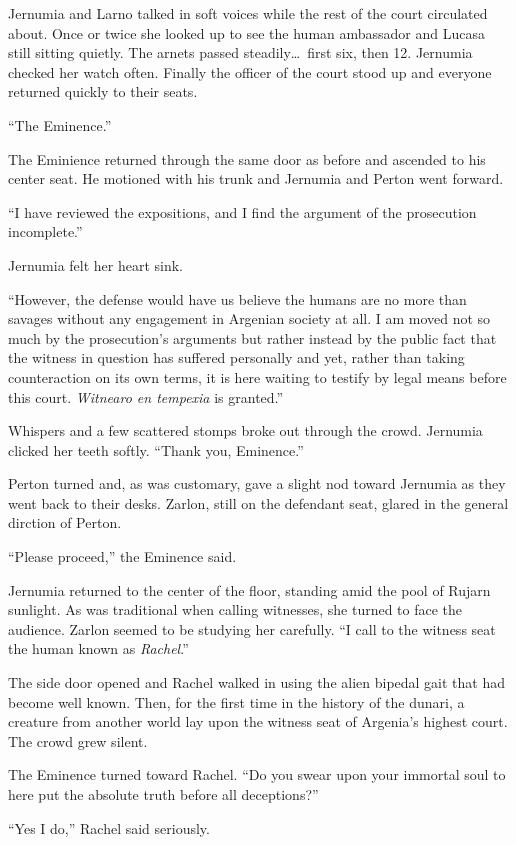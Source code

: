 Jernumia and Larno talked in soft voices while the rest of the court circulated about. Once or
twice she looked up to see the human ambassador and Lucasa still sitting quietly. The arnets
passed steadily\ldots\ first six, then 12. Jernumia checked her watch often. Finally the officer
of the court stood up and everyone returned quickly to their seats.

``The Eminence.''

The Eminience returned through the same door as before and ascended to his center seat. He
motioned with his trunk and Jernumia and Perton went forward.

``I have reviewed the expositions, and I find the argument of the prosecution incomplete.''

Jernumia felt her heart sink.

``However, the defense would have us believe the humans are no more than savages without any
engagement in Argenian society at all. I am moved not so much by the prosecution's arguments but
rather instead by the public fact that the witness in question has suffered personally and yet,
rather than taking counteraction on its own terms, it is here waiting to testify by legal means
before this court. \textit{Witnearo en tempexia} is granted.''

Whispers and a few scattered stomps broke out through the crowd. Jernumia clicked her teeth
softly. ``Thank you, Eminence.''

Perton turned and, as was customary, gave a slight nod toward Jernumia as they went back to
their desks. Zarlon, still on the defendant seat, glared in the general dirction of Perton.

``Please proceed,'' the Eminence said.

Jernumia returned to the center of the floor, standing amid the pool of Rujarn sunlight. As was
traditional when calling witnesses, she turned to face the audience. Zarlon seemed to be
studying her carefully. ``I call to the witness seat the human known as \textit{Rachel}.''

The side door opened and Rachel walked in using the alien bipedal gait that had become well
known. Then, for the first time in the history of the dunari, a creature from another world lay
upon the witness seat of Argenia's highest court. The crowd grew silent.

The Eminence turned toward Rachel. ``Do you swear upon your immortal soul to here put the
absolute truth before all deceptions?''

``Yes I do,'' Rachel said seriously.

